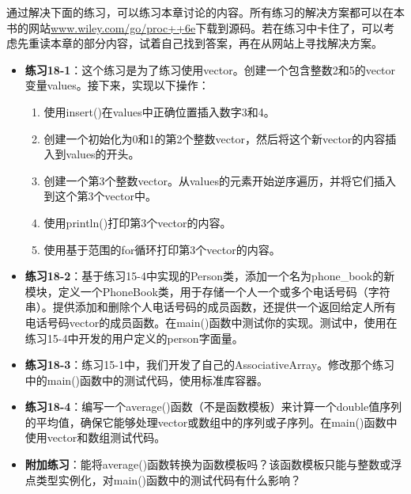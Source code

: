 通过解决下面的练习，可以练习本章讨论的内容。所有练习的解决方案都可以在本书的网站\url{www.wiley.com/go/proc++6e}下载到源码。若在练习中卡住了，可以考虑先重读本章的部分内容，试着自己找到答案，再在从网站上寻找解决方案。

\begin{itemize}
\item
\textbf{练习18-1}：这个练习是为了练习使用vector。创建一个包含整数2和5的vector变量values。接下来，实现以下操作：
\begin{enumerate}
\item
使用insert()在values中正确位置插入数字3和4。

\item
创建一个初始化为0和1的第2个整数vector，然后将这个新vector的内容插入到values的开头。

\item
创建一个第3个整数vector。从values的元素开始逆序遍历，并将它们插入到这个第3个vector中。

\item
使用println()打印第3个vector的内容。

\item
使用基于范围的for循环打印第3个vector的内容。
\end{enumerate}

\item
\textbf{练习18-2}：基于练习15-4中实现的Person类，添加一个名为phone\_book的新模块，定义一个PhoneBook类，用于存储一个人一个或多个电话号码（字符串）。提供添加和删除个人电话号码的成员函数，还提供一个返回给定人所有电话号码vector的成员函数。在main()函数中测试你的实现。测试中，使用在练习15-4中开发的用户定义的person字面量。

\item
\textbf{练习18-3}：练习15-1中，我们开发了自己的AssociativeArray。修改那个练习中的main()函数中的测试代码，使用标准库容器。

\item
\textbf{练习18-4}：编写一个average()函数（不是函数模板）来计算一个double值序列的平均值，确保它能够处理vector或数组中的序列或子序列。在main()函数中使用vector和数组测试代码。

\item
\textbf{附加练习}：能将average()函数转换为函数模板吗？该函数模板只能与整数或浮点类型实例化，对main()函数中的测试代码有什么影响？
\end{itemize}














